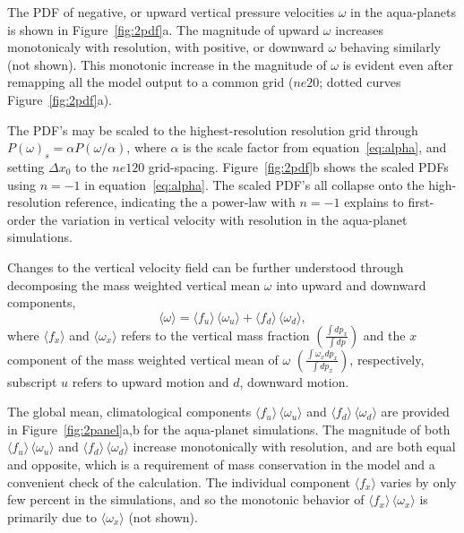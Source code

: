 \documentclass[times]{qjrms4}
\begin{document}
The PDF of negative, or upward vertical pressure velocities $\omega$ in the aqua-planets is shown in Figure~\ref{fig:2pdf}a. The magnitude of upward $\omega$ increases monotonicaly with resolution, with positive, or downward $\omega$ behaving similarly (not shown). This monotonic increase in the magnitude of $\omega$ is evident even after remapping all the model output to a common grid ($ne20$; dotted curves Figure~\ref{fig:2pdf}a).

The PDF's may be scaled to the highest-resolution resolution grid through $P(\omega)_s = \alpha P (\omega / \alpha)$, where $\alpha$ is the scale factor from equation~\ref{eq:alpha}, and setting $\Delta x_0$ to the $ne120$ grid-spacing. Figure~\ref{fig:2pdf}b shows the scaled PDFs using $n=-1$ in equation~\ref{eq:alpha}. The scaled PDF's all collapse onto the high-resolution reference, indicating the a power-law with $n=-1$ explains to first-order the variation in vertical velocity with resolution in the aqua-planet simulations. 

Changes to the vertical velocity field can be further understood through decomposing the mass weighted vertical mean $\omega$ into upward and downward components,
\begin{equation}
\langle \omega \rangle =\langle f_{u} \rangle \, \langle \omega_{u} \rangle + \langle f_{d} \rangle \, \langle \omega_{d} \rangle, \label{eq:omega}
\end{equation}
where $\langle f_x \rangle$ and $\langle \omega_x \rangle$ refers to the vertical mass fraction $ \left( \frac{\int dp_x}{\int dp} \right)$ and the $x$ component of the mass weighted vertical mean of $\omega$ $ \left( \frac{\int \omega_x dp_x}{\int dp_x} \right)$, respectively, subscript $u$ refers to upward motion and $d$, downward motion.

The global mean, climatological components $\langle f_{u} \rangle \, \langle \omega_{u} \rangle$ and $\langle f_{d} \rangle \, \langle \omega_{d} \rangle$ are provided in Figure~\ref{fig:2panel}a,b for the aqua-planet simulations. The magnitude of both $\langle f_{u} \rangle \, \langle \omega_{u} \rangle$ and $\langle f_{d} \rangle \, \langle \omega_{d} \rangle$ increase monotonically with resolution, and are both equal and opposite, which is a requirement of mass conservation in the model and a convenient check of the calculation. The individual component $\langle f_{x} \rangle$ varies by only few percent in the simulations, and so the monotonic behavior of $\langle f_{x} \rangle \, \langle \omega_{x} \rangle$ is primarily due to $ \langle \omega_{x} \rangle$ (not shown).
\end{document}
